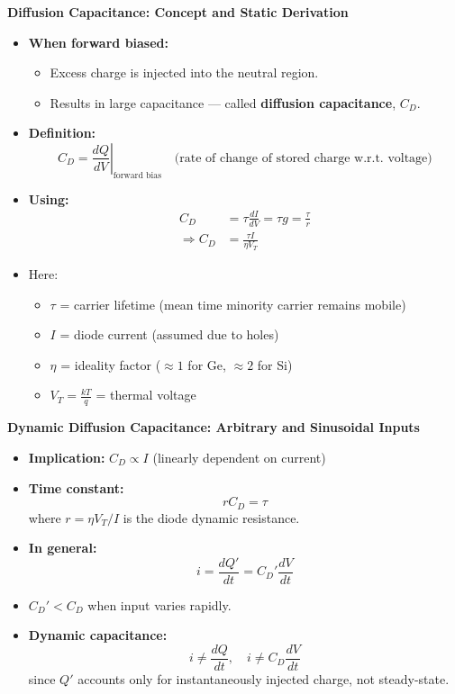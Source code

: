 \begin{frame}{\textbf{Diffusion Capacitance: Concept and Static Derivation}}
	\begin{itemize}
		\item \textbf{When forward biased:}
		\begin{itemize}
			\item Excess charge is injected into the neutral region.
			\item Results in large capacitance — called \textbf{diffusion capacitance}, $C_D$.
		\end{itemize}
		
		\item \textbf{Definition:}
		\[
		C_D = \left. \frac{dQ}{dV} \right|_{\text{forward bias}} \quad \text{(rate of change of stored charge w.r.t. voltage)}
		\]
	
		\item \textbf{Using:}
		\begin{align*}
			C_D &= \tau \frac{dI}{dV} = \tau g = \frac{\tau}{r} \tag{3-27} \\
			\Rightarrow C_D &= \frac{\tau I}{\eta V_T} \tag{3-28}
		\end{align*}
		\item Here:
		\begin{itemize}
			\item $\tau$ = carrier lifetime (mean time minority carrier remains mobile)
			\item $I$ = diode current (assumed due to holes)
			\item $\eta$ = ideality factor ($\approx 1$ for Ge, $\approx 2$ for Si)
			\item $V_T = \frac{kT}{q}$ = thermal voltage
		\end{itemize}
	\end{itemize}
	\end{frame}

	\begin{frame}{\textbf{Dynamic Diffusion Capacitance: Arbitrary and Sinusoidal Inputs}}
		\begin{itemize}
			\item \textbf{Implication:} $C_D \propto I$ (linearly dependent on current)
	
			\item \textbf{Time constant:}
			\[
			r C_D = \tau \tag{3-29}
			\]
			where $r = \eta V_T / I$ is the diode dynamic resistance.
			\item \textbf{In general:}
			\[
			i = \frac{dQ'}{dt} = C_D' \frac{dV}{dt} \tag{3-30}
			\]
			\item $C_D' < C_D$ when input varies rapidly.
		
			\item \textbf{Dynamic capacitance:}
			\[
			i \neq \frac{dQ}{dt}, \quad i \neq C_D \frac{dV}{dt} \tag{3-31}
			\]
			since $Q'$ accounts only for instantaneously injected charge, not steady-state.
		\end{itemize}
		\end{frame}	


